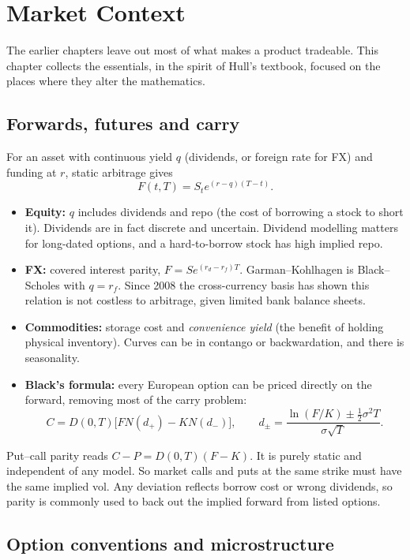 \chapter{Market Context}\label{ch:practice}

The earlier chapters leave out most of what makes a product tradeable. This chapter collects the essentials, in the spirit of Hull's textbook, focused on the places where they alter the mathematics.

\section{Forwards, futures and carry}

For an asset with continuous yield $q$ (dividends, or foreign rate for FX) and funding at $r$, static arbitrage gives
\[
F(t,T)=S_te^{(r-q)(T-t)}.
\]
\begin{itemize}
\item \textbf{Equity:} $q$ includes dividends and repo (the cost of borrowing a stock to short it). Dividends are in fact discrete and uncertain. Dividend modelling matters for long-dated options, and a hard-to-borrow stock has high implied repo.
\item \textbf{FX:} covered interest parity, $F=Se^{(r_d-r_f)T}$. Garman--Kohlhagen is Black--Scholes with $q=r_f$. Since 2008 the cross-currency basis has shown this relation is not costless to arbitrage, given limited bank balance sheets.
\item \textbf{Commodities:} storage cost and \emph{convenience yield} (the benefit of holding physical inventory). Curves can be in contango or backwardation, and there is seasonality.
\item \textbf{Black's formula:} every European option can be priced directly on the forward, removing most of the carry problem:
\[
C=D(0,T)\bigl[FN(d_+)-KN(d_-)\bigr],\qquad d_\pm=\frac{\ln(F/K)\pm\frac12\sigma^2T}{\sigma\sqrt T}.
\]
\end{itemize}

Put--call parity reads $C-P=D(0,T)(F-K)$. It is purely static and independent of any model. So market calls and puts at the same strike must have the same implied vol. Any deviation reflects borrow cost or wrong dividends, so parity is commonly used to back out the implied forward from listed options.

\section{Option conventions and microstructure}

